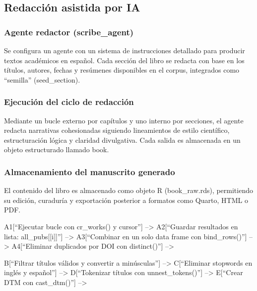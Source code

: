 \documentclass[
  letterpaper,
  DIV=11,
  numbers=noendperiod,
  oneside]{scrreprt}
\begin{document}
\subsection{Redacción asistida por
IA}\label{redacciuxf3n-asistida-por-ia}

\subsubsection{Agente redactor
(scribe\_agent)}\label{agente-redactor-scribe_agent}

Se configura un agente con un sistema de instrucciones detallado para
producir textos académicos en español. Cada sección del libro se redacta
con base en los títulos, autores, fechas y resúmenes disponibles en el
corpus, integrados como ``semilla'' (seed\_section).

\subsubsection{Ejecución del ciclo de
redacción}\label{ejecuciuxf3n-del-ciclo-de-redacciuxf3n}

Mediante un bucle externo por capítulos y uno interno por secciones, el
agente redacta narrativas cohesionadas siguiendo lineamientos de estilo
científico, estructuración lógica y claridad divulgativa. Cada salida es
almacenada en un objeto estructurado llamado book.

\subsubsection{Almacenamiento del manuscrito
generado}\label{almacenamiento-del-manuscrito-generado}

El contenido del libro es almacenado como objeto R (book\_raw.rds),
permitiendo su edición, curaduría y exportación posterior a formatos
como Quarto, HTML o PDF.

A1{[}``Ejecutar bucle con cr\_works() y cursor''{]} --\textgreater{}
A2{[}``Guardar resultados en lista: all\_pubs{[}{[}i{]}{]}''{]}
--\textgreater{} A3{[}``Combinar en un solo data frame con
bind\_rows()''{]} --\textgreater{} A4{[}``Eliminar duplicados por DOI
con distinct()''{]} --\textgreater{}

B{[}``Filtrar títulos válidos y convertir a minúsculas''{]}
--\textgreater{} C{[}``Eliminar stopwords en inglés y español''{]}
--\textgreater{} D{[}``Tokenizar títulos con unnest\_tokens()''{]}
--\textgreater{} E{[}``Crear DTM con cast\_dtm()''{]} --\textgreater{}
\end{document}
